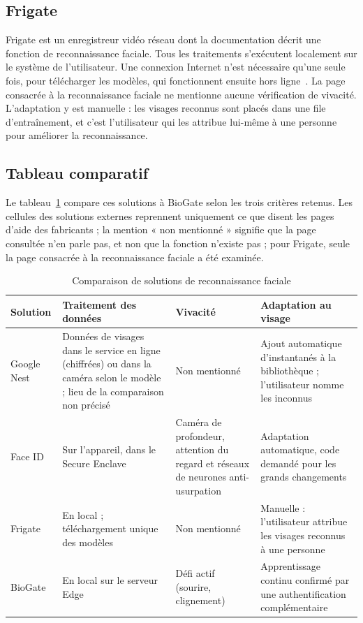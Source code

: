\subsection{Frigate}

Frigate est un enregistreur vidéo réseau dont la documentation décrit une fonction de reconnaissance faciale. Tous les traitements s'exécutent localement sur le système de l'utilisateur. Une connexion Internet n'est nécessaire qu'une seule fois, pour télécharger les modèles, qui fonctionnent ensuite hors ligne~\cite{frigate_face_recognition}. La page consacrée à la reconnaissance faciale ne mentionne aucune vérification de vivacité. L'adaptation y est manuelle : les visages reconnus sont placés dans une file d'entraînement, et c'est l'utilisateur qui les attribue lui-même à une personne pour améliorer la reconnaissance.

\subsection{Tableau comparatif}

Le tableau~\ref{tab:comparatif} compare ces solutions à BioGate selon les trois critères retenus. Les cellules des solutions externes reprennent uniquement ce que disent les pages d'aide des fabricants ; la mention « non mentionné » signifie que la page consultée n'en parle pas, et non que la fonction n'existe pas ; pour Frigate, seule la page consacrée à la reconnaissance faciale a été examinée.

\begin{table}[H]
\centering
\caption{Comparaison de solutions de reconnaissance faciale}\label{tab:comparatif}
\small
\begin{tabularx}{\textwidth}{@{}p{2.2cm}XXX@{}}
\toprule
\textbf{Solution} & \textbf{Traitement des données} & \textbf{Vivacité} & \textbf{Adaptation au visage} \\
\midrule
Google Nest~\cite{google2026familiarface} & Données de visages dans le service en ligne (chiffrées) ou dans la caméra selon le modèle ; lieu de la comparaison non précisé & Non mentionné & Ajout automatique d'instantanés à la bibliothèque ; l'utilisateur nomme les inconnus \\
Face ID~\cite{apple2026faceid} & Sur l'appareil, dans le Secure Enclave & Caméra de profondeur, attention du regard et réseaux de neurones anti-usurpation & Adaptation automatique, code demandé pour les grands changements \\
Frigate~\cite{frigate_face_recognition} & En local ; téléchargement unique des modèles & Non mentionné & Manuelle : l'utilisateur attribue les visages reconnus à une personne \\
BioGate & En local sur le serveur Edge & Défi actif (sourire, clignement) & Apprentissage continu confirmé par une authentification complémentaire \\
\bottomrule
\end{tabularx}
\end{table}

